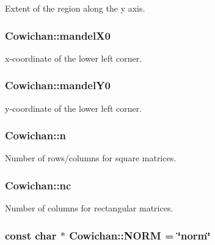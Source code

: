 Extent of the region along the y axis. \hypertarget{class_cowichan_f0bab1165abe53fea17e65764d247786}{
\subsubsection[{mandelX0}]{ {\bf Cowichan::mandelX0}}}
\label{class_cowichan_f0bab1165abe53fea17e65764d247786}


x-coordinate of the lower left corner. \hypertarget{class_cowichan_7b5e0e4e2026c78a6ec45fe306e5af93}{
\subsubsection[{mandelY0}]{ {\bf Cowichan::mandelY0}}}
\label{class_cowichan_7b5e0e4e2026c78a6ec45fe306e5af93}


y-coordinate of the lower left corner. \hypertarget{class_cowichan_10e0c7c7bcccf11869821fa03cb7a6ee}{
\subsubsection[{n}]{ {\bf Cowichan::n}}}
\label{class_cowichan_10e0c7c7bcccf11869821fa03cb7a6ee}


Number of rows/columns for square matrices. \hypertarget{class_cowichan_81d2fc0da7b4ef388a1dbf08ac820eb1}{
\subsubsection[{nc}]{ {\bf Cowichan::nc}}}
\label{class_cowichan_81d2fc0da7b4ef388a1dbf08ac820eb1}


Number of columns for rectangular matrices. \hypertarget{class_cowichan_4e2cd818307d1e806861489216e74a0f}{
\subsubsection[{NORM}]{\setlength{\rightskip}{0pt plus 5cm}const char $\ast$ {\bf Cowichan::NORM} = \char`\"{}norm\char`\"{}}}
\label{class_cowichan_4e2cd818307d1e806861489216e74a0f}



